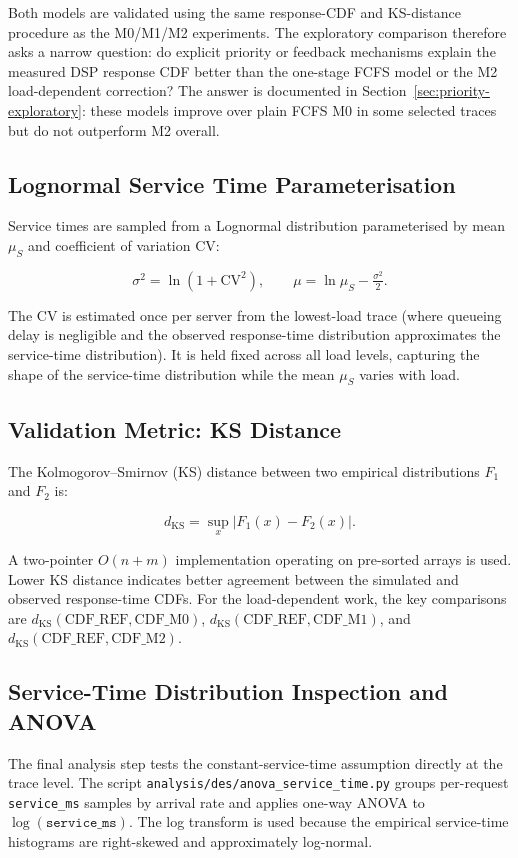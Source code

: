Both models are validated using the same response-CDF and KS-distance procedure as the M0/M1/M2 experiments. The exploratory comparison therefore asks a narrow question: do explicit priority or feedback mechanisms explain the measured DSP response CDF better than the one-stage FCFS model or the M2 load-dependent correction? The answer is documented in Section~\ref{sec:priority-exploratory}: these models improve over plain FCFS M0 in some selected traces but do not outperform M2 overall.

\subsection{Lognormal Service Time Parameterisation}

Service times are sampled from a Lognormal distribution parameterised by mean $\mu_S$ and coefficient of variation $\text{CV}$:

\[
\sigma^2 = \ln(1 + \text{CV}^2), \qquad
\mu = \ln\mu_S - \tfrac{\sigma^2}{2}.
\]

The CV is estimated once per server from the lowest-load trace (where queueing delay is negligible and the observed response-time distribution approximates the service-time distribution). It is held fixed across all load levels, capturing the shape of the service-time distribution while the mean $\mu_S$ varies with load.

\subsection{Validation Metric: KS Distance}

The Kolmogorov--Smirnov (KS) distance between two empirical distributions $F_1$ and $F_2$ is:

\[
d_\text{KS} = \sup_x |F_1(x) - F_2(x)|.
\]

A two-pointer $O(n + m)$ implementation operating on pre-sorted arrays is used. Lower KS distance indicates better agreement between the simulated and observed response-time CDFs. For the load-dependent work, the key comparisons are $d_\text{KS}(\text{CDF\_REF}, \text{CDF\_M0})$, $d_\text{KS}(\text{CDF\_REF}, \text{CDF\_M1})$, and $d_\text{KS}(\text{CDF\_REF}, \text{CDF\_M2})$.

\subsection{Service-Time Distribution Inspection and ANOVA}

The final analysis step tests the constant-service-time assumption directly at the trace level. The script \texttt{analysis/des/anova\_service\_time.py} groups per-request \texttt{service\_ms} samples by arrival rate and applies one-way ANOVA to $\log(\texttt{service\_ms})$. The log transform is used because the empirical service-time histograms are right-skewed and approximately log-normal.

